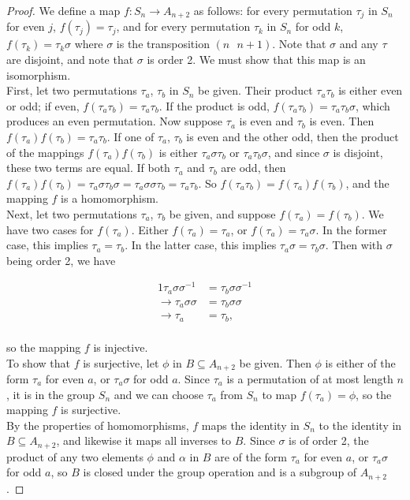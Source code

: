 \documentclass{article}
\begin{document}
\begin{proof}
    We define a map $f: S_n \rightarrow A_{n+2}$ as follows: for every permutation $\tau_j$ in $S_n$ for even $j$, $f(\tau_j) = \tau_j$, and for every permutation $\tau_k$ in $S_n$ for odd $k$, $f(\tau_k) = \tau_k \sigma$ where $\sigma$ is the transposition $ ( n \: \: \: n+1 )$.  Note that $\sigma$ and any $\tau$ are disjoint, and note that $\sigma$ is order 2.  We must show that this map is an isomorphism. \\

First, let two permutations $\tau_a$, $\tau_b$ in $S_n$ be given.  Their product $\tau_a \tau_b$ is either even or odd; if even, $f(\tau_a \tau_b) = \tau_a \tau_b$.  If the product is odd, $f(\tau_a \tau_b) = \tau_a \tau_b \sigma$, which produces an even permutation.  Now suppose $\tau_a$ is even and $\tau_b$ is even.  Then $f(\tau_a)f(\tau_b) = \tau_a \tau_b$.  If one of $\tau_a$, $\tau_b$ is even and the other odd, then the product of the mappings $f(\tau_a)f(\tau_b)$ is either $\tau_a \sigma \tau_b$ or $\tau_a \tau_b \sigma$, and since $\sigma$ is disjoint, these two terms are equal.  If both $\tau_a$ and $\tau_b$ are odd, then $f(\tau_a)f(\tau_b) = \tau_a \sigma \tau_b \sigma = \tau_a \sigma \sigma \tau_b = \tau_a \tau_b$.  So $f(\tau_a \tau_b) = f(\tau_a)f(\tau_b)$, and the mapping $f$ is a homomorphism. \\

Next, let two permutations $\tau_a$, $\tau_b$ be given, and suppose $f(\tau_a) = f(\tau_b)$.  We have two cases for $f(\tau_a)$.  Either $f(\tau_a) = \tau_a$, or $f(\tau_a) = \tau_a \sigma$.  In the former case, this implies $\tau_a = \tau_b$.  In the latter case, this implies $\tau_a \sigma = \tau_b \sigma$.  Then with $\sigma$ being order 2, we have 

\begin{alignat*}{1}
    \tau_a \sigma \sigma^{-1} &= \tau_b \sigma \sigma^{-1}  \\ 
    \rightarrow \tau_a \sigma \sigma &= \tau_b \sigma \sigma \\ 
    \rightarrow \tau_a &= \tau_b, \\
\end{alignat*}

so the mapping $f$ is injective. \\

To show that $f$ is surjective, let $\phi$ in $B \subseteq A_{n+2}$ be given.  Then $\phi$ is either of the form $\tau_a$ for even $a$, or $\tau_a \sigma$ for odd $a$.  Since $\tau_a$ is a permutation of at most length $n$, it is in the group $S_n$ and we can choose $\tau_a$ from $S_n$ to map $f(\tau_a) = \phi$, so the mapping $f$ is surjective. \\

By the properties of homomorphisms, $f$ maps the identity in $S_n$ to the identity in $B \subseteq A_{n+2}$, and likewise it maps all inverses to $B$.  Since $\sigma$ is of order 2, the product of any two elements $\phi$ and $\alpha$ in $B$ are of the form $\tau_a$ for even $a$, or $\tau_a \sigma$ for odd $a$, so $B$ is closed under the group operation and is a subgroup of $A_{n+2}$.
\end{proof}
\end{document}
